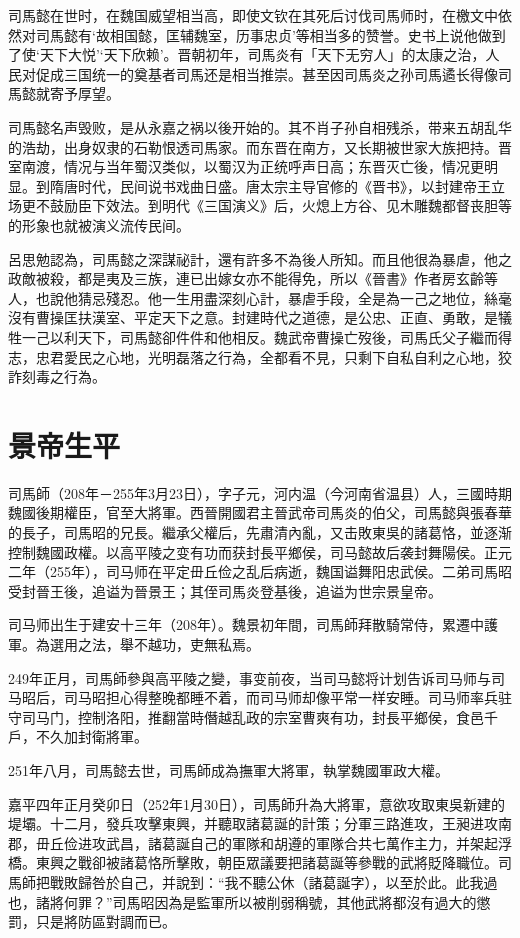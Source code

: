 司馬懿在世时，在魏国威望相当高，即使文钦在其死后讨伐司馬师时，在檄文中依然对司馬懿有‘故相国懿，匡辅魏室，历事忠贞’等相当多的赞誉。史书上说他做到了使‘天下大悦’‘天下欣赖’。晋朝初年，司馬炎有「天下无穷人」的太康之治，人民对促成三国统一的奠基者司馬还是相当推崇。甚至因司馬炎之孙司馬遹长得像司馬懿就寄予厚望。

司馬懿名声毁败，是从永嘉之祸以後开始的。其不肖子孙自相残杀，带来五胡乱华的浩劫，出身奴隶的石勒恨透司馬家。而东晋在南方，又长期被世家大族把持。晋室南渡，情况与当年蜀汉类似，以蜀汉为正统呼声日高；东晋灭亡後，情况更明显。到隋唐时代，民间说书戏曲日盛。唐太宗主导官修的《晋书》，以封建帝王立场更不鼓励臣下效法。到明代《三国演义》后，火熄上方谷、见木雕魏都督丧胆等的形象也就被演义流传民间。

呂思勉認為，司馬懿之深謀祕計，還有許多不為後人所知。而且他很為暴虐，他之政敵被殺，都是夷及三族，連已出嫁女亦不能得免，所以《晉書》作者房玄齡等人，也說他猜忌殘忍。他一生用盡深刻心計，暴虐手段，全是為一己之地位，絲毫沒有曹操匡扶漢室、平定天下之意。封建時代之道德，是公忠、正直、勇敢，是犠牲一己以利天下，司馬懿卻件件和他相反。魏武帝曹操亡歿後，司馬氏父子繼而得志，忠君愛民之心地，光明磊落之行為，全都看不見，只剩下自私自利之心地，狡詐刻毒之行為。

\section{景帝生平}

司馬師（208年－255年3月23日），字子元，河内温（今河南省温县）人，三國時期魏國後期權臣，官至大將軍。西晉開國君主晉武帝司馬炎的伯父，司馬懿與張春華的長子，司馬昭的兄長。繼承父權后，先肅清內亂，又击敗東吳的諸葛恪，並逐渐控制魏國政權。以高平陵之变有功而获封長平鄉侯，司马懿故后袭封舞陽侯。正元二年（255年），司马师在平定毌丘俭之乱后病逝，魏国谥舞阳忠武侯。二弟司馬昭受封晉王後，追谥为晉景王；其侄司馬炎登基後，追谥为世宗景皇帝。

司马师出生于建安十三年（208年）。魏景初年間，司馬師拜散騎常侍，累遷中護軍。為選用之法，舉不越功，吏無私焉。

249年正月，司馬師參與高平陵之變，事变前夜，当司马懿将计划告诉司马师与司马昭后，司马昭担心得整晚都睡不着，而司马师却像平常一样安睡。司马师率兵驻守司马门，控制洛阳，推翻當時僭越乱政的宗室曹爽有功，封長平鄉侯，食邑千戶，不久加封衛將軍。

251年八月，司馬懿去世，司馬師成為撫軍大將軍，執掌魏國軍政大權。

嘉平四年正月癸卯日（252年1月30日），司馬師升為大將軍，意欲攻取東吳新建的堤壩。十二月，發兵攻擊東興，并聽取諸葛誕的計策；分軍三路進攻，王昶进攻南郡，毌丘俭进攻武昌，諸葛誕自己的軍隊和胡遵的軍隊合共七萬作主力，并架起浮橋。東興之戰卻被諸葛恪所擊敗，朝臣眾議要把諸葛誕等參戰的武將貶降職位。司馬師把戰敗歸咎於自己，并說到：“我不聽公休（諸葛誕字），以至於此。此我過也，諸將何罪？”司馬昭因為是監軍所以被削弱稱號，其他武將都沒有過大的懲罰，只是將防區對調而已。

